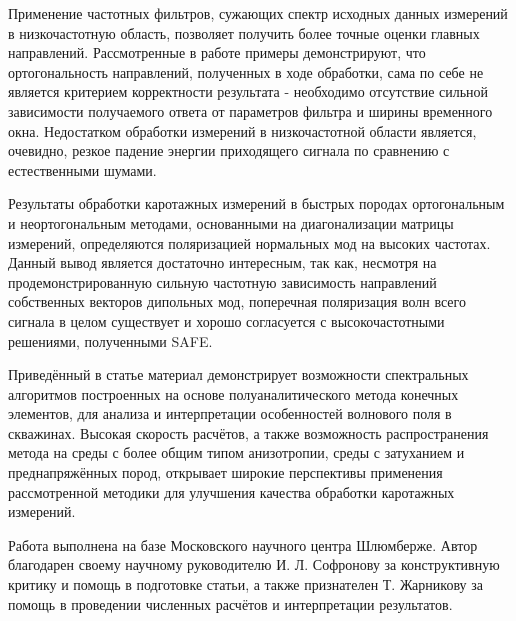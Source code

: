 \documentclass[a4paper,11pt]{article}
\begin{document}
Применение частотных фильтров, сужающих спектр исходных данных измерений в низкочастотную область, позволяет получить более точные оценки главных направлений. Рассмотренные в работе примеры демонстрируют, что ортогональность направлений, полученных в ходе обработки, сама по себе не является критерием корректности результата - необходимо отсутствие сильной зависимости получаемого ответа от параметров фильтра и ширины временного окна. Недостатком обработки измерений в низкочастотной области является, очевидно, резкое падение энергии приходящего сигнала по сравнению с естественными шумами.

Результаты обработки каротажных измерений в быстрых породах ортогональным и неортогональным методами, основанными на диагонализации матрицы измерений, определяются поляризацией нормальных мод на высоких частотах. Данный вывод является достаточно интересным, так как, несмотря на продемонстрированную сильную частотную зависимость направлений собственных векторов дипольных мод, поперечная поляризация волн всего сигнала в целом существует и хорошо согласуется с высокочастотными решениями, полученными SAFE. 


Приведённый в статье материал демонстрирует возможности спектральных алгоритмов построенных на основе полуаналитического метода конечных элементов, для анализа и интерпретации особенностей волнового поля в скважинах. Высокая скорость расчётов, а также возможность распространения метода на среды с более общим типом анизотропии, среды с затуханием и преднапряжённых пород, открывает широкие перспективы применения рассмотренной методики для улучшения качества обработки каротажных измерений. 

Работа выполнена на базе Московского научного центра Шлюмберже. Автор благодарен своему научному руководителю И. Л. Софронову за конструктивную критику и помощь
в подготовке статьи, а также признателен Т. Жарникову за помощь в проведении численных расчётов и интерпретации результатов.
\end{document}
